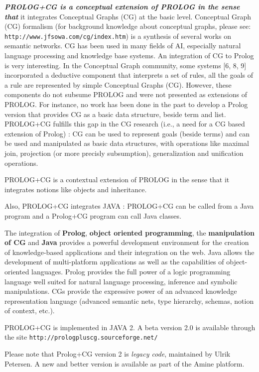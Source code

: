 \documentclass{book}
\begin{document}
{\it {\bf PROLOG+CG is a conceptual extension of PROLOG in the sense
that}} it integrates Conceptual Graphs (CG) at the basic
level. Conceptual Graph (CG) formalism (for background knowledge about
conceptual graphs, please see:
\verb+http://www.jfsowa.com/cg/index.htm+) is a synthesis of several
works on semantic networks. CG has been used in many fields of AI,
especially natural language processing and knowledge base systems. An
integration of CG to Prolog is very interesting. In the Conceptual
Graph community, some systems [6, 8, 9] incorporated a deductive
component that interprets a set of rules, all the goals of a rule are
represented by simple Conceptual Graphs (CG). However, these
components do not subsume PROLOG and were not presented as extensions
of PROLOG. For instance, no work has been done in the past to develop
a Prolog version that provides CG as a basic data structure, beside
term and list. PROLOG+CG fulfills this gap in the CG research (i.e., a
need for a CG based extension of Prolog) : CG can be used to represent
goals (beside terms) and can be used and manipulated as basic data
structures, with operations like maximal join, projection (or more
precisly subsumption), generalization and unification operations.

PROLOG+CG is a contextual extension of PROLOG in the sense that it
integrates notions like objects and inheritance.

Also, PROLOG+CG integrates JAVA : PROLOG+CG can be called from a Java
program and a Prolog+CG program can call Java classes.

The integration of {\bf Prolog}, {\bf object oriented programming},
the {\bf manipulation of CG} and {\bf Java} provides a powerful
development environment for the creation of knowledge-based
applications and their integration on the web. Java allows the
development of multi-platform applications as well as the capabilities
of object-oriented languages. Prolog provides the full power of a
logic programming language well suited for natural language
processing, inference and symbolic manipulations. CGs provide the
expressive power of an advanced knowledge representation language
(advanced semantic nets, type hierarchy, schemas, notion of context,
etc.).

PROLOG+CG is implemented in JAVA 2. A beta version 2.0 is available
through the site \verb+http://prologpluscg.sourceforge.net/+

Please note that Prolog+CG version 2 is {\it legacy code}, maintained
by Ulrik Petersen.  A new and better version is available as part of
the Amine platform.
\end{document}
